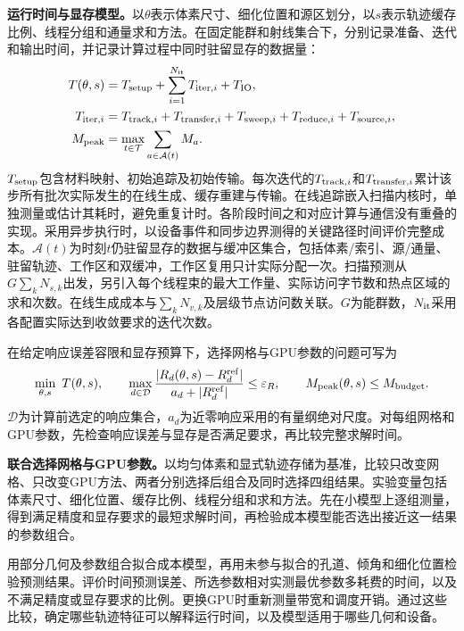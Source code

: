\documentclass[UTF8, zihao=-4, fontset=none, a4paper]{ctexart}
\begin{document}
\textbf{运行时间与显存模型。}以\(\theta\)表示体素尺寸、细化位置和源区划分，以\(s\)表示轨迹缓存比例、线程分组和通量求和方法。在固定能群和射线集合下，分别记录准备、迭代和输出时间，并记录计算过程中同时驻留显存的数据量：
\begin{equation}
\begin{aligned}
T(\theta,s)&=T_{\rm setup}+\sum_{i=1}^{N_{\rm it}}T_{{\rm iter},i}+T_{\rm IO},\\
T_{{\rm iter},i}&=T_{{\rm track},i}+T_{{\rm transfer},i}+T_{{\rm sweep},i}
 +T_{{\rm reduce},i}+T_{{\rm source},i},\\
M_{\rm peak}&=\max_{t\in\mathcal T}\sum_{a\in\mathcal A(t)}M_a.
\end{aligned}
\label{eq:cost}
\end{equation}
\(T_{\rm setup}\)包含材料映射、初始追踪及初始传输。每次迭代的\(T_{{\rm track},i}\)和\(T_{{\rm transfer},i}\)累计该步所有批次实际发生的在线生成、缓存重建与传输。在线追踪嵌入扫描内核时，单独测量或估计其耗时，避免重复计时。各阶段时间之和对应计算与通信没有重叠的实现。采用异步执行时，以设备事件和同步边界测得的关键路径时间评价完整成本。\(\mathcal A(t)\)为时刻\(t\)仍驻留显存的数据与缓冲区集合，包括体素/索引、源/通量、驻留轨迹、工作区和双缓冲，工作区复用只计实际分配一次。扫描预测从\(G\sum_kN_{s,k}\)出发，另引入每个线程束的最大工作量、实际访问字节数和热点区域的求和次数。在线生成成本与\(\sum_kN_{v,k}\)及层级节点访问数关联。\(G\)为能群数，\(N_{\rm it}\)采用各配置实际达到收敛要求的迭代次数。

在给定响应误差容限和显存预算下，选择网格与GPU参数的问题可写为
\begin{equation}
\min_{\theta,s}\ T(\theta,s),\qquad
\max_{d\in\mathcal D}\frac{|R_d(\theta,s)-R_d^{\rm ref}|}{a_d+|R_d^{\rm ref}|}\leq\varepsilon_R,
\qquad M_{\rm peak}(\theta,s)\leq M_{\rm budget}.
\label{eq:joint}
\end{equation}
\(\mathcal D\)为计算前选定的响应集合，\(a_d\)为近零响应采用的有量纲绝对尺度。对每组网格和GPU参数，先检查响应误差与显存是否满足要求，再比较完整求解时间。

\textbf{联合选择网格与GPU参数。}以均匀体素和显式轨迹存储为基准，比较只改变网格、只改变GPU方法、两者分别选择后组合及同时选择四组结果。实验变量包括体素尺寸、细化位置、缓存比例、线程分组和求和方法。先在小模型上逐组测量，得到满足精度和显存要求的最短求解时间，再检验成本模型能否选出接近这一结果的参数组合。

用部分几何及参数组合拟合成本模型，再用未参与拟合的孔道、倾角和细化位置检验预测结果。评价时间预测误差、所选参数相对实测最优参数多耗费的时间，以及不满足精度或显存要求的比例。更换GPU时重新测量带宽和调度开销。通过这些比较，确定哪些轨迹特征可以解释运行时间，以及模型适用于哪些几何和设备。
\end{document}
